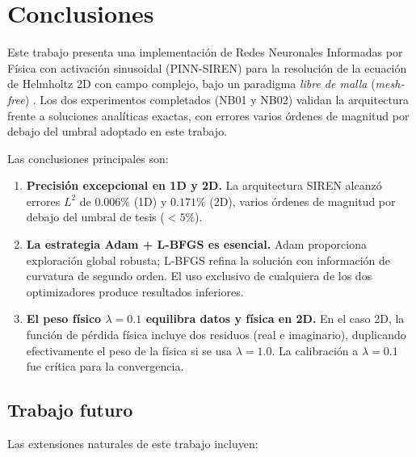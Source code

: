 
\section{Conclusiones}
\label{sec:conclusiones}

Este trabajo presenta una implementación de Redes Neuronales Informadas por Física
con activación sinusoidal (PINN-SIREN) para la resolución de la ecuación de Helmholtz
2D con campo complejo, bajo un paradigma \textit{libre de malla} (\textit{mesh-free})
\cite{Karniadakis2021_review,Cuomo2022_review}.
Los dos experimentos completados (NB01 y NB02) validan la arquitectura frente a
soluciones analíticas exactas, con errores varios órdenes de magnitud por debajo del
umbral adoptado en este trabajo.

Las conclusiones principales son:

\begin{enumerate}
  \item \textbf{Precisión excepcional en 1D y 2D.}
    La arquitectura SIREN alcanzó errores $L^2$ de $0.006\%$ (1D) y $0.171\%$ (2D),
    varios órdenes de magnitud por debajo del umbral de tesis ($< 5\%$).

  \item \textbf{La estrategia Adam + L-BFGS es esencial.}
    Adam proporciona exploración global robusta; L-BFGS refina la solución con
    información de curvatura de segundo orden.
    El uso exclusivo de cualquiera de los dos optimizadores produce resultados inferiores.

  \item \textbf{El peso físico $\lambda = 0.1$ equilibra datos y física en 2D.}
    En el caso 2D, la función de pérdida física incluye dos residuos (real e imaginario),
    duplicando efectivamente el peso de la física si se usa $\lambda = 1.0$.
    La calibración a $\lambda = 0.1$ fue crítica para la convergencia.
\end{enumerate}

\subsection*{Trabajo futuro}

Las extensiones naturales de este trabajo incluyen:

